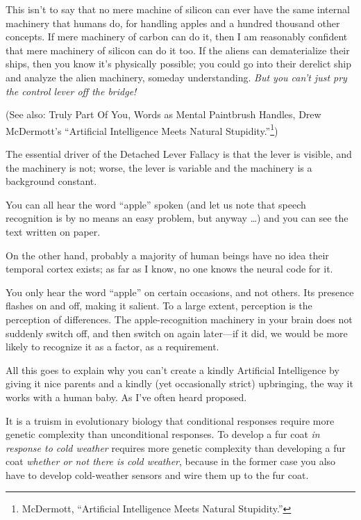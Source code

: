 {
 This isn't to say that no mere machine of silicon
can ever have the same internal machinery that humans do, for handling
apples and a hundred thousand other concepts. If mere machinery of
carbon can do it, then I am reasonably confident that mere machinery of
silicon can do it too. If the aliens can dematerialize their ships,
then you know it's physically possible; you could go
into their derelict ship and analyze the alien machinery, someday
understanding. \textit{But you can't just pry the
control lever off the bridge!}}

{
 (See also: Truly Part Of You, Words as Mental Paintbrush Handles,
Drew McDermott's ``Artificial
Intelligence Meets Natural
Stupidity.''\footnote{McDermott, ``Artificial Intelligence Meets
Natural Stupidity.''})}

{
 The essential driver of the Detached Lever Fallacy is that the
lever is visible, and the machinery is not; worse, the lever is
variable and the machinery is a background constant.}

{
 You can all hear the word
``apple'' spoken (and let us note
that speech recognition is by no means an easy problem, but anyway
\ldots) and you can see the text written on paper.}

{
 On the other hand, probably a majority of human beings have no
idea their temporal cortex exists; as far as I know, no one knows the
neural code for it.}

{
 You only hear the word
``apple'' on certain occasions, and
not others. Its presence flashes on and off, making it salient. To a
large extent, perception is the perception of differences. The
apple-recognition machinery in your brain does not suddenly switch off,
and then switch on again later---if it did, we would be more likely to
recognize it as a factor, as a requirement.}

{
 All this goes to explain why you can't create a
kindly Artificial Intelligence by giving it nice parents and a kindly
(yet occasionally strict) upbringing, the way it works with a human
baby. As I've often heard proposed.}

{
 It is a truism in evolutionary biology that conditional responses
require more genetic complexity than unconditional responses. To
develop a fur coat \textit{in response to cold weather} requires more
genetic complexity than developing a fur coat \textit{whether or not
there is cold weather}, because in the former case you also have to
develop cold-weather sensors and wire them up to the fur coat.}

